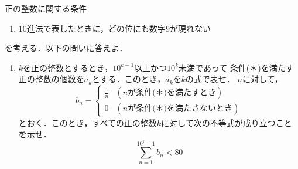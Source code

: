 \documentclass[../../main.tex]{subfiles}
\begin{document}
正の整数に関する条件
\begin{enumerate}
  \item[(＊)]10進法で表したときに，どの位にも数字9が現れない
\end{enumerate}
を考える．以下の問いに答えよ．
\begin{enumerate}
  \item$k$を正の整数とするとき，${10}^{k-1}$以上かつ${10}^k$未満であって
    条件(＊)を満たす正の整数の個数を$a_k$とする．このとき，$a_k$を$k$の式で表せ．
  $n$に対して，
    \[ b_n=
      \begin{cases} \displaystyle\frac{1}{n} & (n\text{が条件(＊)を満たすとき})
        \\ 0 & (n\text{が条件(＊)を満たさないとき})
    \end{cases} \]
    とおく．このとき，すべての正の整数$k$に対して次の不等式が成り立つことを示せ．
    \[ \sum_{n=1}^{{10}^k-1}b_n<80 \]
\end{enumerate}
\end{document}
